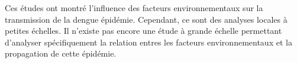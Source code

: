 Ces études ont montré l'influence des facteurs environnementaux sur la transmission de la dengue épidémie. Cependant, ce sont des analyses locales à petites échelles. Il n'existe pas encore une étude à grande échelle permettant d'analyser spécifiquement la relation entres les facteurs environnementaux et la propagation de cette épidémie. 

